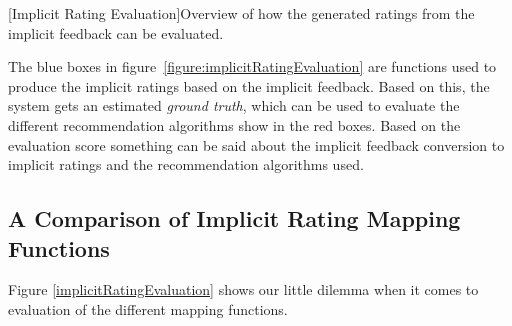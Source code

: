 \begin{center}
    [Implicit Rating Evaluation]{Overview of how the generated ratings from the implicit feedback can be evaluated.}
  	\label{figure:implicitRatingEvaluation}
  \end{center}

The blue boxes in figure~\ref{figure:implicitRatingEvaluation} are functions used to produce the implicit ratings based on the implicit feedback. Based on this, the system gets an estimated \emph{ground truth}, which can be used to evaluate the different recommendation algorithms show in the red boxes. Based on the evaluation score something can be said about the implicit feedback conversion to implicit ratings and the recommendation algorithms used.



\subsection{A Comparison of Implicit Rating Mapping Functions}

Figure \ref{implicitRatingEvaluation} shows our little dilemma when it comes to evaluation of the different mapping functions.

